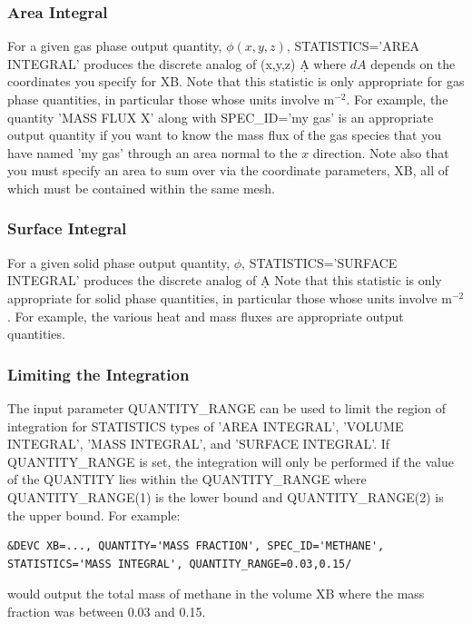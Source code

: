 \documentclass[11pt]{book}
\begin{document}
\subsubsection{Area Integral}

For a given gas phase output quantity, $\phi(x,y,z)$, {\ct STATISTICS='AREA INTEGRAL'} produces the discrete analog of
\be \int \phi(x,y,z) \; \d A \ee
where $dA$ depends on the coordinates you specify for {\ct XB}.
Note that this statistic is only appropriate for gas phase quantities, in particular those whose units involve m$^{-2}$. For example,
the quantity {\ct 'MASS FLUX X'} along with {\ct SPEC\_ID='my gas'} is an appropriate output quantity if you want to know the mass flux of the gas species that
you have named {\ct 'my gas'} through an
area normal to the $x$ direction. Note also that you must specify an area to sum over via the
coordinate parameters, {\ct XB}, all of which must be contained within the same mesh.

\subsubsection{Surface Integral}

For a given solid phase output quantity, $\phi$, {\ct STATISTICS='SURFACE INTEGRAL'} produces the discrete analog of
\be \int \phi \; \d A \ee
Note that this statistic is only appropriate for solid phase quantities, in particular those whose units involve m$^{-2}$. For example, the various heat and mass
fluxes are appropriate output quantities.

\subsubsection{Limiting the Integration}

The input parameter {\ct QUANTITY\_RANGE} can be used to limit the region of integration for {\ct STATISTICS} types of {\ct 'AREA INTEGRAL'}, {\ct 'VOLUME INTEGRAL'}, {\ct 'MASS INTEGRAL'}, and {\ct 'SURFACE INTEGRAL'}.  If {\ct QUANTITY\_RANGE} is set, the integration will only be performed if the value of the {\ct QUANTITY} lies within the {\ct QUANTITY\_RANGE} where {\ct QUANTITY\_RANGE(1)} is the lower bound and {\ct QUANTITY\_RANGE(2)} is the upper bound.  For example:

\begin{lstlisting}
&DEVC XB=..., QUANTITY='MASS FRACTION', SPEC_ID='METHANE', STATISTICS='MASS INTEGRAL', QUANTITY_RANGE=0.03,0.15/
\end{lstlisting}
would output the total mass of methane in the volume {\ct XB} where the mass fraction was between 0.03 and 0.15.
\end{document}
